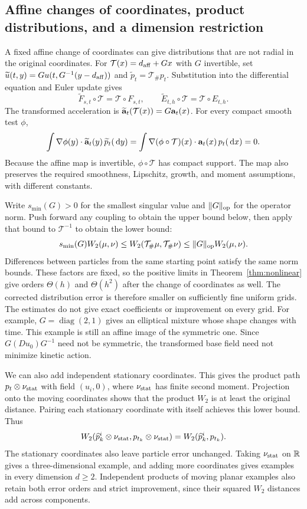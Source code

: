 \subsection{Affine changes of coordinates, product distributions, and a dimension restriction}
\label{app:extensions}

A fixed affine change of coordinates can give distributions that are not radial in the original coordinates. For $\mathcal T(x)=d_{\rm aff}+Gx$ with $G$ invertible, set $\widetilde u(t,y)=Gu(t,G^{-1}(y-d_{\rm aff}))$ and $\widetilde p_t=\mathcal T_\#p_t$. Substitution into the differential equation and Euler update gives
\[
 \widetilde F_{s,t}\circ\mathcal T=\mathcal T\circ F_{s,t},\qquad
 \widetilde E_{t,h}\circ\mathcal T=\mathcal T\circ E_{t,h}.
\]
The transformed acceleration is $\widetilde{\mathbf a}_t(\mathcal T(x))=G\mathbf a_t(x)$. For every compact smooth test $\phi$,
\[
 \int\nabla\phi(y)\cdot\widetilde{\mathbf a}_t(y)\,\widetilde p_t(\,\mathrm d y)
 =\int\nabla(\phi\circ\mathcal T)(x)\cdot\mathbf a_t(x)\,p_t(\,\mathrm d x)=0.
\]
Because the affine map is invertible, $\phi\circ\mathcal T$ has compact support. The map also preserves the required smoothness, Lipschitz, growth, and moment assumptions, with different constants.

Write $s_{\min}(G)>0$ for the smallest singular value and $\|G\|_{\rm op}$ for the operator norm. Push forward any coupling to obtain the upper bound below, then apply that bound to $\mathcal T^{-1}$ to obtain the lower bound:
\[
 s_{\min}(G)W_2(\mu,\nu)
 \le W_2(\mathcal T_\#\mu,\mathcal T_\#\nu)
 \le\|G\|_{\rm op}W_2(\mu,\nu).
\]
Differences between particles from the same starting point satisfy the same norm bounds. These factors are fixed, so the positive limits in Theorem~\ref{thm:nonlinear} give orders $\Theta(h)$ and $\Theta(h^2)$ after the change of coordinates as well. The corrected distribution error is therefore smaller on sufficiently fine uniform grids. The estimates do not give exact coefficients or improvement on every grid. For example, $G=\operatorname{diag}(2,1)$ gives an elliptical mixture whose shape changes with time. This example is still an affine image of the symmetric one. Since $G(Du_0)G^{-1}$ need not be symmetric, the transformed base field need not minimize kinetic action.

We can also add independent stationary coordinates. This gives the product path $p_t\otimes\nu_{\rm stat}$ with field $(u_i,0)$, where $\nu_{\rm stat}$ has finite second moment. Projection onto the moving coordinates shows that the product $W_2$ is at least the original distance. Pairing each stationary coordinate with itself achieves this lower bound. Thus
\[
 W_2(\widehat p_k^i\otimes \nu_{\rm stat},p_{t_k}\otimes \nu_{\rm stat})
 =W_2(\widehat p_k^i,p_{t_k}).
\]
The stationary coordinates also leave particle error unchanged. Taking $\nu_{\rm stat}$ on $\mathbb R$ gives a three-dimensional example, and adding more coordinates gives examples in every dimension $d\ge2$. Independent products of moving planar examples also retain both error orders and strict improvement, since their squared $W_2$ distances add across components.

